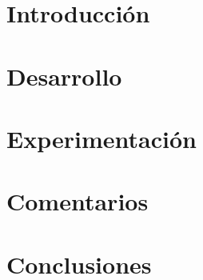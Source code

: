 \documentclass[11pt, a4paper]{article}
\begin{document}
\def\runtitulo{Reconocimiento de dígitos}


\maketitle
\newpage


\newpage

\tableofcontents
\newpage

\section{Introducción}

\FloatBarrier
\newpage

\section{Desarrollo}

\FloatBarrier
\newpage

\section{Experimentación}

\FloatBarrier
\newpage

\section{Comentarios}


\section{Conclusiones}

\FloatBarrier
\newpage
%



\end{document}

